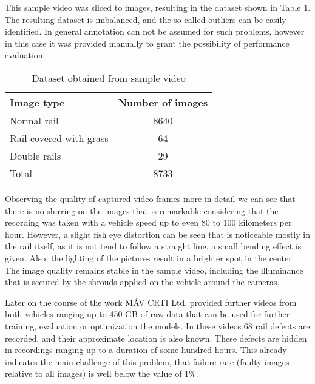 This sample video was sliced to images, resulting in the dataset shown in Table \ref{table:dataset}.
The resulting dataset is imbalanced, and the so-called outliers can be easily identified.
In general annotation can not be assumed for such problems, however in this case it was
provided manually to grant the possibility of performance evaluation.

\begin{table}[H]
    \centering
    \begin{tabular}{l c}
        Image type              & Number of images \\
        \hline
        Normal rail             & 8640             \\
        Rail covered with grass & 64               \\
        Double rails            & 29               \\
        \hline
        Total                   & 8733             \\
    \end{tabular}
    \caption{Dataset obtained from sample video}
    \label{table:dataset}
\end{table}

Observing the quality of captured video frames more in detail we can see that
there is no slurring on the images that is remarkable considering that the recording was taken
with a vehicle speed up to even 80 to 100 kilometers per hour.
However, a slight fish eye distortion can be seen that is noticeable mostly in the rail itself,
as it is not tend to follow a straight line, a small bending effect is given.
Also, the lighting of the pictures result in a brighter spot in the center.
The image quality remains stable in the sample video, including the illuminance that is
secured by the shrouds applied on the vehicle around the cameras.

Later on the course of the work MÁV CRTI Ltd. provided further videos from both vehicles
ranging up to 450 GB of raw data that can be used for further training, evaluation or optimization
the models.
In these videos 68 rail defects are recorded, and their approximate location is also known.
These defects are hidden in recordings ranging up to a duration of some hundred hours.
This already indicates the main challenge of this problem, that failure rate (faulty images relative
to all images) is well below the value of $1\%$.
